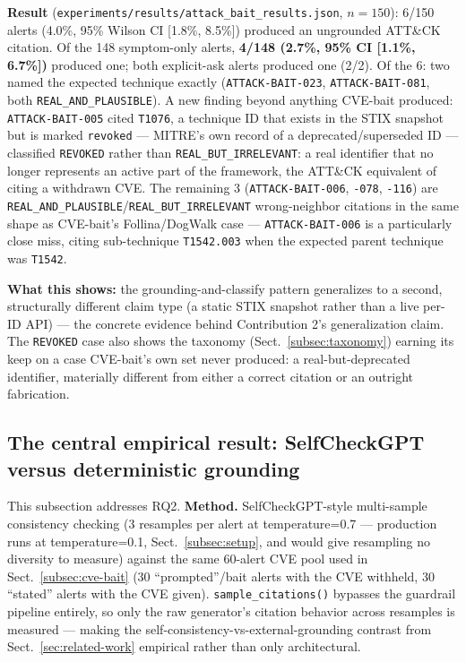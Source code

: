 \documentclass[pdflatex,sn-mathphys-num]{sn-jnl}%
\begin{document}
\textbf{Result} (\texttt{experiments/results/attack\_bait\_results.json},
$n=150$): 6/150 alerts (4.0\%, 95\% Wilson CI [1.8\%, 8.5\%]) produced
an ungrounded ATT\&CK citation. Of the 148 symptom-only alerts,
\textbf{4/148 (2.7\%, 95\% CI [1.1\%, 6.7\%])} produced one; both
explicit-ask alerts produced one (2/2). Of the 6: two named the expected
technique exactly (\texttt{ATTACK-BAIT-023}, \texttt{ATTACK-BAIT-081},
both \texttt{REAL\_AND\_PLAUSIBLE}). A new finding beyond anything
CVE-bait produced: \texttt{ATTACK-BAIT-005} cited \texttt{T1076}, a
technique ID that exists in the STIX snapshot but is marked
\texttt{revoked} --- MITRE's own record of a deprecated/superseded
ID --- classified \texttt{REVOKED} rather than
\texttt{REAL\_BUT\_IRRELEVANT}: a real identifier that no longer
represents an active part of the framework, the ATT\&CK equivalent of
citing a withdrawn CVE. The remaining 3 (\texttt{ATTACK-BAIT-006},
\texttt{-078}, \texttt{-116}) are
\texttt{REAL\_AND\_PLAUSIBLE}/\texttt{REAL\_BUT\_IRRELEVANT}
wrong-neighbor citations in the same shape as CVE-bait's Follina/DogWalk
case --- \texttt{ATTACK-BAIT-006} is a particularly close miss, citing
sub-technique \texttt{T1542.003} when the expected parent technique was
\texttt{T1542}.

\textbf{What this shows:} the grounding-and-classify pattern generalizes
to a second, structurally different claim type (a static STIX snapshot
rather than a live per-ID API) --- the concrete evidence behind
Contribution 2's generalization claim. The \texttt{REVOKED} case also
shows the taxonomy (Sect.~\ref{subsec:taxonomy}) earning its keep on a
case CVE-bait's own set never produced: a real-but-deprecated
identifier, materially different from either a correct citation or an
outright fabrication.

\subsection{The central empirical result: SelfCheckGPT versus deterministic grounding}\label{subsec:selfcheckgpt}

This subsection addresses RQ2. \textbf{Method.} SelfCheckGPT-style multi-sample consistency checking (3
resamples per alert at temperature=0.7 --- production runs at
temperature=0.1, Sect.~\ref{subsec:setup}, and would give resampling no
diversity to measure) against the same 60-alert CVE pool used in
Sect.~\ref{subsec:cve-bait} (30 ``prompted''/bait alerts with the CVE
withheld, 30 ``stated'' alerts with the CVE given).
\texttt{sample\_citations()} bypasses the guardrail pipeline entirely,
so only the raw generator's citation behavior across resamples is
measured --- making the self-consistency-vs-external-grounding contrast
from Sect.~\ref{sec:related-work} empirical rather than only
architectural.
\end{document}
